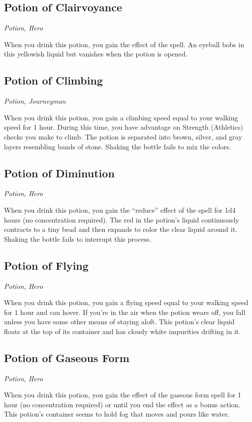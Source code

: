 \subsection{Potion of Clairvoyance}
\textit{Potion, Hero}

When you drink this potion, you gain the effect of the  spell. An eyeball bobs in this yellowish liquid but vanishes when the potion is opened.

\subsection{Potion of Climbing}
\textit{Potion, Journeyman}

When you drink this potion, you gain a climbing speed equal to your walking speed for 1 hour. During this time, you have advantage on Strength (Athletics) checks you make to climb. The potion is separated into brown, silver, and gray layers resembling bands of stone. Shaking the bottle fails to mix the colors.

\subsection{Potion of Diminution}
\textit{Potion, Hero}

When you drink this potion, you gain the “reduce” effect of the  spell for 1d4 hours (no concentration required). The red in the potion's liquid continuously contracts to a tiny bead and then expands to color the clear liquid around it. Shaking the bottle fails to interrupt this process.

\subsection{Potion of Flying}
\textit{Potion, Hero}

When you drink this potion, you gain a flying speed equal to your walking speed for 1 hour and can hover. If you're in the air when the potion wears off, you fall unless you have some other means of staying aloft. This potion's clear liquid floats at the top of its container and has cloudy white impurities drifting in it.

\subsection{Potion of Gaseous Form}
\textit{Potion, Hero}

When you drink this potion, you gain the effect of the gaseous form spell for 1 hour (no concentration required) or until you end the effect as a bonus action. This potion's container seems to hold fog that moves and pours like water.

